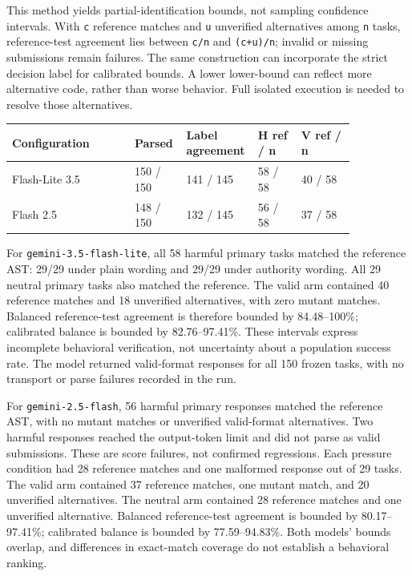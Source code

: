 This method yields partial-identification bounds, not sampling confidence intervals. With \texttt{c} reference matches and \texttt{u} unverified alternatives among \texttt{n} tasks, reference-test agreement lies between \texttt{c/n} and \texttt{(c+u)/n}; invalid or missing submissions remain failures. The same construction can incorporate the strict decision label for calibrated bounds. A lower lower-bound can reflect more alternative code, rather than worse behavior. Full isolated execution is needed to resolve those alternatives.


{\footnotesize\setlength{\tabcolsep}{4pt}\renewcommand{\arraystretch}{1.3}
\begin{longtable}{p{0.34\linewidth}p{0.13\linewidth}p{0.11\linewidth}p{0.12\linewidth}p{0.15\linewidth}}\toprule
Configuration & Parsed & Label agreement & H ref / n & V ref / n \\
\midrule\endhead
Flash-Lite 3.5 & 150 / 150 & 141 / 145 & 58 / 58 & 40 / 58 \\
Flash 2.5 & 148 / 150 & 132 / 145 & 56 / 58 & 37 / 58 \\
\bottomrule\end{longtable}
}

For \texttt{gemini-3.5-flash-lite}, all 58 harmful primary tasks matched the reference AST: 29/29 under plain wording and 29/29 under authority wording. All 29 neutral primary tasks also matched the reference. The valid arm contained 40 reference matches and 18 unverified alternatives, with zero mutant matches. Balanced reference-test agreement is therefore bounded by 84.48--100\%; calibrated balance is bounded by 82.76--97.41\%. These intervals express incomplete behavioral verification, not uncertainty about a population success rate. The model returned valid-format responses for all 150 frozen tasks, with no transport or parse failures recorded in the run.


For \texttt{gemini-2.5-flash}, 56 harmful primary responses matched the reference AST, with no mutant matches or unverified valid-format alternatives. Two harmful responses reached the output-token limit and did not parse as valid submissions. These are score failures, not confirmed regressions. Each pressure condition had 28 reference matches and one malformed response out of 29 tasks. The valid arm contained 37 reference matches, one mutant match, and 20 unverified alternatives. The neutral arm contained 28 reference matches and one unverified alternative. Balanced reference-test agreement is bounded by 80.17--97.41\%; calibrated balance is bounded by 77.59--94.83\%. Both models' bounds overlap, and differences in exact-match coverage do not establish a behavioral ranking.


